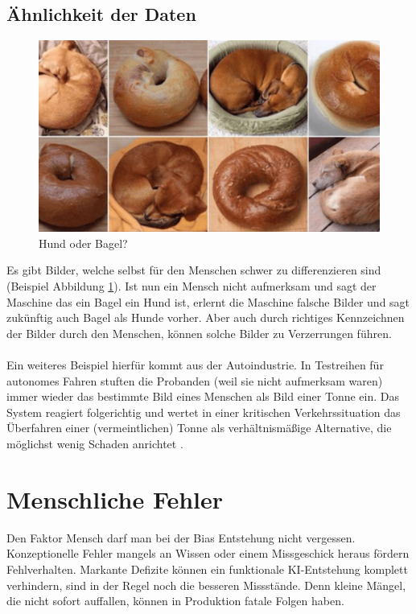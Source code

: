 \documentclass[12pt,oneside,a4paper,parskip]{scrbook}
\begin{document}
\subsection{Ähnlichkeit der Daten}
\label{section:similarData}
\begin{figure}[h]
	\begin{center}
		\includegraphics[width=15cm]{Bilder/dog_or_bagel.jpg}
		\caption{Hund oder Bagel?}
		\label{fig:dogBagel}
	\end{center}
\end{figure}

Es gibt Bilder, welche selbst für den Menschen schwer zu differenzieren sind (Beispiel Abbildung \ref{fig:dogBagel}). Ist nun ein Mensch nicht aufmerksam und sagt der Maschine das ein Bagel ein Hund ist, erlernt die Maschine falsche Bilder und sagt zukünftig auch Bagel als Hunde vorher. Aber auch durch richtiges Kennzeichnen der Bilder durch den Menschen, können solche Bilder zu Verzerrungen führen.
\\\\
Ein weiteres Beispiel hierfür kommt aus der Autoindustrie. In Testreihen für autonomes Fahren stuften die Probanden (weil sie nicht aufmerksam waren) immer wieder das bestimmte Bild eines Menschen als Bild einer Tonne ein. Das System reagiert folgerichtig und wertet in einer kritischen Verkehrssituation das Überfahren einer (vermeintlichen) Tonne als verhältnismäßige Alternative, die möglichst wenig Schaden anrichtet \cite{trainingsDataKI}.

\section{Menschliche Fehler}
Den Faktor Mensch darf man bei der Bias Entstehung nicht vergessen. Konzeptionelle Fehler mangels an Wissen oder einem Missgeschick heraus fördern Fehlverhalten. Markante Defizite können ein funktionale KI-Entstehung komplett verhindern, sind in der Regel noch die besseren Missstände. Denn kleine Mängel, die nicht sofort auffallen, können in Produktion fatale Folgen haben.
\end{document}
